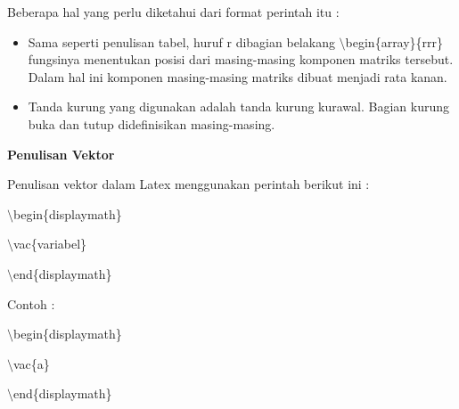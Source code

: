 Beberapa hal yang perlu diketahui dari format perintah itu :

\begin{itemize}
\item Sama seperti penulisan tabel, huruf r dibagian belakang 
$\setminus$begin\{array\}\{rrr\} fungsinya menentukan posisi dari masing-masing komponen matriks tersebut. Dalam hal ini komponen masing-masing matriks dibuat menjadi rata kanan.
\item Tanda kurung yang digunakan adalah tanda kurung kurawal. Bagian kurung buka dan tutup didefinisikan masing-masing.
\end{itemize}


\textbf{Penulisan Vektor}\par \vspace{12pt}

Penulisan vektor dalam Latex menggunakan perintah berikut ini :
\par \vspace{12pt}
$\setminus$begin\{displaymath\}
\par \vspace{12pt}
$\setminus$vac\{variabel\}
\par \vspace{12pt}
$\setminus$end\{displaymath\}
\par \vspace{12pt}
Contoh :
\par \vspace{12pt}
$\setminus$begin\{displaymath\}
\par \vspace{12pt}
$\setminus$vac\{a\}
\par \vspace{12pt}
$\setminus$end\{displaymath\}
\par \vspace{12pt}

